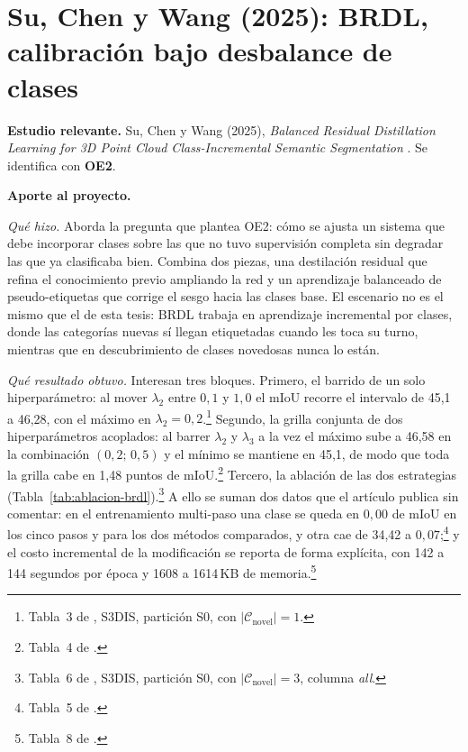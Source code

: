 \section[BRDL]{Su, Chen y Wang (2025): BRDL, calibración bajo desbalance de
clases}
\label{sec:brdl}

\textbf{Estudio relevante.} Su, Chen y Wang (2025), \emph{Balanced Residual
Distillation Learning for 3D Point Cloud Class-Incremental Semantic
Segmentation} \cite{su2025brdl}. Se identifica con \textbf{OE2}.

\textbf{Aporte al proyecto.}

\emph{Qué hizo.} Aborda la pregunta que plantea OE2: cómo se ajusta un sistema
que debe incorporar clases sobre las que no tuvo supervisión completa sin
degradar las que ya clasificaba bien. Combina dos piezas, una destilación
residual que refina el conocimiento previo ampliando la red y un aprendizaje
balanceado de pseudo-etiquetas que corrige el sesgo hacia las clases base. El
escenario no es el mismo que el de esta tesis: BRDL trabaja en aprendizaje
incremental por clases, donde las categorías nuevas sí llegan etiquetadas cuando
les toca su turno, mientras que en descubrimiento de clases novedosas nunca lo
están.

\emph{Qué resultado obtuvo.} Interesan tres bloques. Primero, el barrido de un
solo hiperparámetro: al mover $\lambda_2$ entre $0{,}1$ y $1{,}0$ el mIoU recorre
el intervalo de 45,1 a 46,28, con el máximo en
$\lambda_2=0{,}2$.\footnote{Tabla~3 de \cite{su2025brdl}, S3DIS, partición S0,
con $|\mathcal{C}_{\text{novel}}|=1$.} Segundo, la grilla conjunta de dos
hiperparámetros acoplados: al barrer $\lambda_2$ y $\lambda_3$ a la vez el máximo
sube a 46,58 en la combinación $(0{,}2;\,0{,}5)$ y el mínimo se mantiene en 45,1,
de modo que toda la grilla cabe en 1,48 puntos de mIoU.\footnote{Tabla~4 de
\cite{su2025brdl}.} Tercero, la ablación de las dos estrategias
(Tabla~\ref{tab:ablacion-brdl}).\footnote{Tabla~6 de \cite{su2025brdl}, S3DIS,
partición S0, con $|\mathcal{C}_{\text{novel}}|=3$, columna \emph{all}.} A ello
se suman dos datos que el artículo publica sin comentar: en el entrenamiento
multi-paso una clase se queda en $0{,}00$ de mIoU en los cinco pasos y para los
dos métodos comparados, y otra cae de 34,42 a $0{,}07$;\footnote{Tabla~5 de
\cite{su2025brdl}.} y el costo incremental de la modificación se reporta de forma
explícita, con 142 a 144 segundos por época y 1608 a 1614\,KB de
memoria.\footnote{Tabla~8 de \cite{su2025brdl}.}

